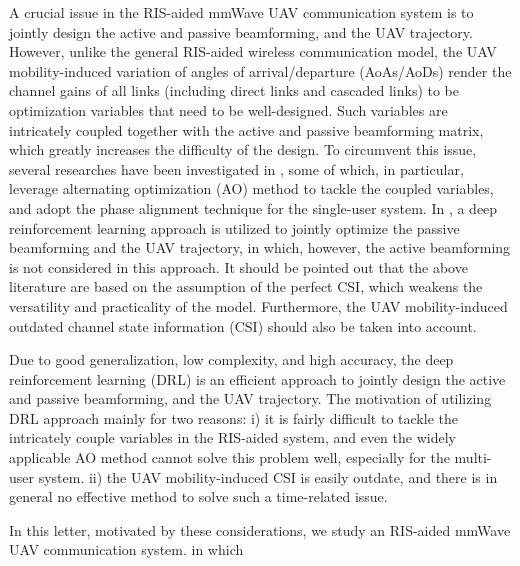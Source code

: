 \documentclass[journal]{IEEEtran}
\begin{document}
A crucial issue in the RIS-aided mmWave UAV communication system is to jointly design the active and passive beamforming, and the UAV trajectory. However, unlike the general RIS-aided wireless communication model, the UAV mobility-induced variation of angles of arrival/departure (AoAs/AoDs) render the channel gains of all links (including direct links and cascaded links) to be optimization variables that need to be well-designed. Such variables are intricately coupled together with the active and passive beamforming matrix, which greatly increases the difficulty of the design. To circumvent this issue, several researches have been investigated in \cite{RIS-3,RISUAV-1,RISUAV-5,RISUAV-6,RISUAV-9}, some of which, in particular, leverage alternating optimization (AO) method \cite{RIS-3,RISUAV-1,RISUAV-5,RISUAV-9} to tackle the coupled variables, and adopt the phase alignment technique \cite{RIS-3} for the single-user system. In \cite{RISUAV-6}, a deep reinforcement learning approach is utilized to jointly optimize the passive beamforming and the UAV trajectory, in which, however, the active beamforming is not considered in this approach. It should be pointed out that the above literature \cite{RIS-3,RISUAV-1,RISUAV-5,RISUAV-6} are based on the assumption of the perfect CSI, which weakens the versatility and practicality of the model. Furthermore, the UAV mobility-induced outdated channel state information (CSI) should also be taken into account. 

Due to good generalization, low complexity, and high accuracy, the deep reinforcement learning (DRL) is an efficient approach to jointly design the active and passive beamforming, and the UAV trajectory. The motivation of utilizing DRL approach mainly for two reasons: i) it is fairly difficult to tackle the intricately couple variables in the RIS-aided system, and even the widely applicable AO method cannot solve this problem well, especially for the multi-user system. ii) the UAV mobility-induced CSI is easily outdate, and there is in general no effective method to solve such a time-related issue.

In this letter, motivated by these considerations, we study an RIS-aided mmWave UAV communication system. in which 
\end{document}
